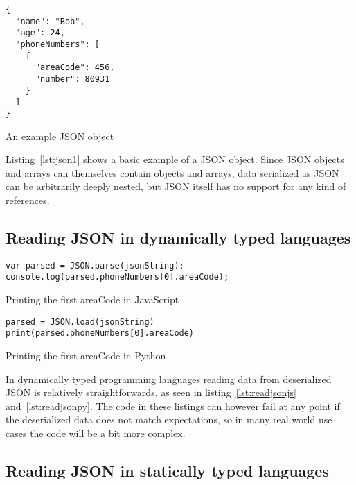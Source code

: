 


\begin{listing}[ht!]
\begin{verbatim}
{
  "name": "Bob",
  "age": 24,
  "phoneNumbers": [
    {
      "areaCode": 456,
      "number": 80931
    }
  ]
}
\end{verbatim}
\caption{An example JSON object}
\label{lst:json1}
\end{listing}

Listing~\ref{lst:json1} shows a basic example of a JSON object. Since JSON objects and arrays can themselves contain objects and arrays, data serialized as JSON can be arbitrarily deeply nested, but JSON itself has no support for any kind of references.

\subsection{Reading JSON in dynamically typed languages}

\begin{listing}[ht!]
\begin{verbatim}
var parsed = JSON.parse(jsonString);
console.log(parsed.phoneNumbers[0].areaCode);
\end{verbatim}
\caption{Printing the first areaCode in JavaScript}
\label{lst:readjsonjs}
\end{listing}

\begin{listing}[ht!]
\begin{verbatim}
parsed = JSON.load(jsonString)
print(parsed.phoneNumbers[0].areaCode)
\end{verbatim}
\caption{Printing the first areaCode in Python}
\label{lst:readjsonpy}
\end{listing}

In dynamically typed programming languages reading data from deserialized JSON is relatively straightforwards, as seen in listing~\ref{lst:readjsonjs} and~\ref{lst:readjsonpy}. The code in these listings can however fail at any point if the deserialized data does not match expectations, so in many real world use cases the code will be a bit more complex.

\subsection{Reading JSON in statically typed languages}

